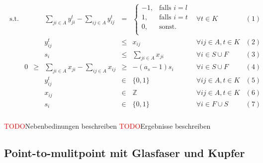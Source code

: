 \documentclass[11pt,a4paper]{article}
\newcommand{\Z}{\mathbb{Z}}
\newcommand{\TODO}{\textcolor{red}{TODO}}
\theoremstyle{my_th_style1}
\begin{document}
 \begin{align*}
 \begin{array}{rcrcrcll}
 \textrm{s.t.}  
&& &\displaystyle\sum_{ji \in A} y_{ji}^t - \displaystyle\sum_{ij \in A} y_{ij}^t& = & \left\{\begin{array}{cl} 
 -1, & \text{falls } i=l\\ 
 1, & \text{falls } i=t\\ 
 0, & \text{sonst.}\\ 
 \end{array}
 \right. & \forall t \in K & (1) \\
 &&& y_{ij}^t & \leq & x_{ij} & \forall ij \in A, t\in K & (2)\\
 &&& s_i &\leq& \displaystyle\sum_{ji \in A} x_{ji}& \forall  i \in S \cup F& (3)\\ 
 &0&\geq&\displaystyle\sum_{ji \in A} x_{ji} - \displaystyle\sum_{ij \in A} x_{ij}&\geq& -(a_s-1)s_i & \forall i \in S \cup F& (4)\\
 &&& y_{ij}^t & \in & \{0,1 \}& \forall ij \in A, t \in K & (5)\\
 &&& x_{ij} & \in & \Z & \forall ij \in A, t \in K & (6)\\
 &&& s_i & \in & \{ 0,1 \} & \forall i \in F \cup S & (7) \\
 \end{array}
 \end{align*}
 
 \TODO Nebenbedinungen beschreiben
 \TODO Ergebnisse beschreiben
 \subsection{Point-to-mulitpoint mit Glasfaser und Kupfer}
\end{document}
